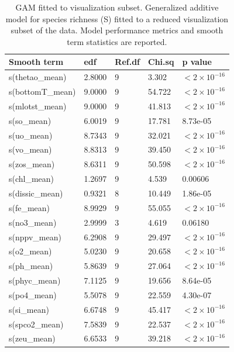 \documentclass[a4paper,fleqn]{cas-sc}
\begin{document}
\begin{table}[width=.9\linewidth,cols=5,pos=!htbp]
\caption{GAM fitted to visualization subset. Generalized additive model for species richness (S) fitted to a reduced visualization subset of the data. Model performance metrics and smooth term statistics are reported.}
\small
\begin{tabular*}{\tblwidth}{@{} LLLLL @{}}
\toprule
\textbf{Smooth term} & \textbf{edf} & \textbf{Ref.df} & \textbf{Chi.sq} & \textbf{p value} \\
\midrule
s(thetao\_mean)      & 2.8000 & 9 &  3.302 & $<2 \times 10^{-16}$ \\
s(bottomT\_mean) & 9.0000 & 9 & 54.722 & $<2 \times 10^{-16}$ \\
s(mlotst\_mean)   & 9.0000 & 9 & 41.813 & $<2 \times 10^{-16}$ \\
s(so\_mean)       & 6.0019 & 9 & 17.781 & 8.73e-05 \\
s(uo\_mean)       & 8.7343 & 9 & 32.021 & $<2 \times 10^{-16}$ \\
s(vo\_mean)       & 8.8313 & 9 & 39.450 & $<2 \times 10^{-16}$ \\
s(zos\_mean)      & 8.6311 & 9 & 50.598 & $<2 \times 10^{-16}$ \\
s(chl\_mean)      & 1.2697 & 9 &  4.539 & 0.00606  \\
s(dissic\_mean)   & 0.9321 & 8 & 10.449 & 1.86e-05 \\
s(fe\_mean)       & 8.9929 & 9 & 55.055 & $<2 \times 10^{-16}$ \\
s(no3\_mean)      & 2.9999 & 3 &  4.619 & 0.06180  \\
s(nppv\_mean)     & 6.2908 & 9 & 29.497 & $<2 \times 10^{-16}$ \\
s(o2\_mean)       & 5.0230 & 9 & 20.658 & $<2 \times 10^{-16}$ \\
s(ph\_mean)       & 5.8639 & 9 & 27.064 & $<2 \times 10^{-16}$ \\
s(phyc\_mean)     & 7.1125 & 9 & 19.656 & 8.64e-05 \\
s(po4\_mean)      & 5.5078 & 9 & 22.559 & 4.30e-07 \\
s(si\_mean)       & 6.6748 & 9 & 45.417 & $<2 \times 10^{-16}$ \\
s(spco2\_mean)    & 7.5839 & 9 & 22.537 & $<2 \times 10^{-16}$ \\
s(zeu\_mean)      & 6.6533 & 9 & 39.218 & $<2 \times 10^{-16}$ \\
\bottomrule
\end{tabular*}
\label{tab:17}
\end{table}
\FloatBarrier
\end{document}
